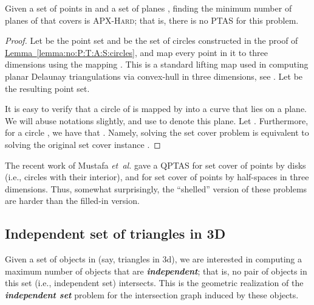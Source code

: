\documentclass[12pt]{article}
\newcommand{\etal}{\textit{et~al.}\xspace}
\newcommand{\Term}[1]{\textsf{#1}}
\newcommand{\emphic}[2]{\textcolor{blue25}{\textbf{\emph{#1}}}\index{#2}}
\renewcommand{\emphic}[2]{\textbf{\emph{#1}}}
\newcommand{\emphi}[1]{\emphic{#1}{#1}}
\theoremstyle{remark}\theoremheaderfont{\sf}\theorembodyfont{\upshape}
\numberwithin{figure}{section}\numberwithin{table}{section}\numberwithin{equation}{section}
\newcommand{\HLink}[2]{\hyperref[#2]{#1~\ref*{#2}}}
\newcommand{\lemlab}[1]{\label{lemma:#1}}
\newcommand{\lemref}[1]{\HLink{Lemma}{lemma:#1}}
\providecommand{\ComplexityClass}[1]{{{\textcolor[named]{ColorComplexityClass}{\textsc{#1}}}}}
\newcommand{\PTAS}{\Term{PTAS}\xspace}
\newcommand{\QPTAS}{\Term{QPTAS}\xspace}
\newcommand{\APXHard}{\ComplexityClass{APX-Hard}\xspace}
\begin{document}
\begin{lemma}
  \lemlab{no:PTAS:cover:planes}Given a set of points  in  and a set of planes
  , finding the minimum number of planes of  that
  covers  is \APXHard; that is, there is no \PTAS for this
  problem.
\end{lemma}
\begin{proof}
  Let  be the point set and  be the set of circles
  constructed in the proof of \lemref{no:P:T:A:S:circles}, and map
  every point in it to three dimensions using the mapping
  .  This is a standard lifting
  map used in computing planar Delaunay triangulations via convex-hull
  in three dimensions, see \cite{bcko-cgaa-08}.  Let
   be the resulting point set.

  It is easy to verify that a circle of  is mapped by
   into a curve that lies on a plane. We will abuse notations
  slightly, and use  to denote this plane.  Let
  . Furthermore, for a circle ,
  we have that .  Namely,
  solving the set cover problem  is equivalent
  to solving the original set cover instance .
\end{proof}


The recent work of Mustafa \etal \cite{mr-irghs-10} gave a \QPTAS for
set cover of points by disks (i.e., circles with their interior), and
for set cover of points by half-spaces in three dimensions. Thus,
somewhat surprisingly, the ``shelled'' version of these problems are
harder than the filled-in version.  


\subsection{Independent set of triangles in 3D}


Given a set  of  objects in  (say, triangles in
3d), we are interested in computing a maximum number of objects that
are \emphi{independent}; that is, no pair of objects in this set
(i.e., independent set) intersects. This is the geometric realization
of the \emphi{independent set} problem for the intersection graph
induced by these objects.
\end{document}
